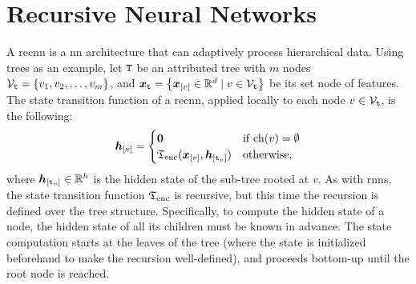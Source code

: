 \begin{figure*}[h!]
    \centering
    \resizebox{.7\textwidth}{!}{}
    \caption{The teacher forcing strategy for training a sequence generator with RNNs.}
    \label{fig:teacher-forcing}
\end{figure*}

\section{Recursive Neural Networks} \label{sec:recnns}
A \gls{recnn} \citep{sperduti1997generalizedneuron,frasconi1998general} is a \gls{nn} architecture that can adaptively process hierarchical data. Using trees as an example, let $\mathtt{T}$ be an attributed tree with $m$ nodes $\Nodes{t} = \Set{v_1, v_2, \ldots, v_m}$, and $\Vector{x}_{\Tree{t}} = \Set{\Elem{x}{v} \in \Real^d \mid v \in \Nodes{t}}$ be its set node of features. The state transition function of a \gls{recnn}, applied locally to each node $v \in \Nodes{t}$, is the following:
\begin{align*}
    \Elem{h}{v}=
    \begin{cases}
        \boldsymbol{0} & \mathrm{if}\; \Fun{ch}(v) = \emptyset\\
        \EncTrans(\Elem{x}{v}, \Elem{h}{\Tree{t}_v}) & \mathrm{otherwise},
    \end{cases}
\end{align*}
where $\Elem{h}{\Tree{t}_v} \in \Real^h$ is the hidden state of the sub-tree rooted at $v$. As with \glspl{rnn}, the state transition function $\mathfrak{T}_{\mathrm{enc}}$ is recursive, but this time the recursion is defined over the tree structure. Specifically, to compute the hidden state of a node, the hidden state of all its children must be known in advance. The state computation starts at the leaves of the tree (where the state is initialized beforehand to make the recursion well-defined), and proceeds bottom-up until the root node is reached.
